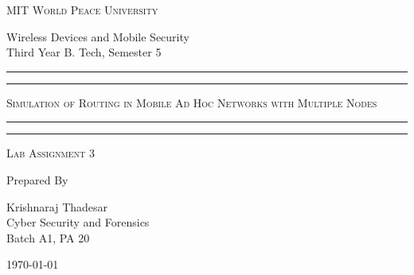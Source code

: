 \documentclass[11pt]{article}
\begin{document}
\begin{titlepage}
    \centering


    \huge\textsc{
        MIT World Peace University
    }\\

    \vspace{0.75\baselineskip} %

    \LARGE{
        Wireless Devices and Mobile Security\\
        Third Year B. Tech, Semester 5
    }

    \vfill %


    \rule{\textwidth}{1.6pt}\vspace*{-\baselineskip}\vspace*{2pt}
    \rule{\textwidth}{0.6pt}
    \vspace{0.75\baselineskip} %



    \huge{\textsc{
            Simulation of Routing in Mobile Ad Hoc Networks with Multiple Nodes
        }} \\



    \vspace{0.5\baselineskip} %
    \rule{\textwidth}{0.6pt}\vspace*{-\baselineskip}\vspace*{2.8pt}
    \rule{\textwidth}{1.6pt}

    \vspace{1\baselineskip} %


    \LARGE\textsc{
        Lab Assignment 3
    } %
    \vfill


    Prepared By
    \vspace{0.5\baselineskip} %

    \Large{
        Krishnaraj Thadesar \\
        Cyber Security and Forensics\\
        Batch A1, PA 20
    }


    \vspace{0.5\baselineskip} %
    \today

\end{titlepage}
\end{document}
